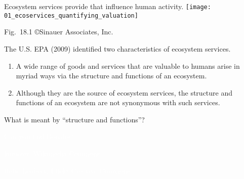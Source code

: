 \documentclass[t]{beamer}
\begin{document}

\begin{frame}[t]{Ecosystem services provide  that influence human activity.}
	\texttt{[image: 01\_ecoservices\_quantifying\_valuation]}
	
	\vfilll
	
	\hfill \tiny Fig.~18.1 \copyright Sinauer Associates, Inc.
\end{frame}

\begin{frame}[t]{The U.S. EPA (2009) identified two characteristics of ecosystem services.}

	\begin{enumerate}

	\item A wide range of goods and services that are valuable to humans arise in myriad ways via the structure and functions of an ecosystem.

	\vspace*{\baselineskip}
		
	\item Although they are the source of ecosystem services, the structure and functions of an ecosystem are not synonymous with such services.
	
	\end{enumerate}
	
	\hangpara What is meant by “structure and functions”?

\end{frame}


{
\begin{frame}[b]{\textcolor{white}{Can you find Bonaire?}}

\hfill\tiny\textcolor{white}{kmusser, Wikimedia Commons.}
\end{frame}
}


{
\begin{frame}[b]

\hfill\tiny\textcolor{white}{Rebe Leubert, Flickr Creative Commons.}
\end{frame}
}
\end{document}
